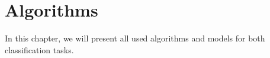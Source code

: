 \section{Algorithms}
In this chapter, we will present all used algorithms and models for both classification tasks.